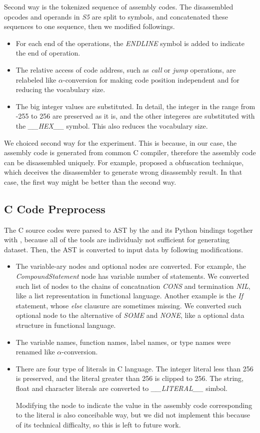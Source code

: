 \documentclass[senior,final,11pt]{iscs-thesis}
\begin{document}
Second way is the tokenized sequence of assembly codes. 
The disassembled opcodes and operands in {\sl S5} are split to symbols, and concatenated these sequences to one sequence, then we modified followings.
\begin{itemize}
\item For each end of the operations, the {\sl ENDLINE} symbol is added to indicate the end of operation.
\item 
The relative access of code address, such as {\sl call} or {\sl jump} operations, 
are relabeled like $\alpha$-conversion for making code position independent and for reducing the vocabulary size.
\item The big integer values are substituted. 
In detail, the integer in the range from -255 to 256 are preserved as it is, and the other integeres are substituted with the {\sl \_\_HEX\_\_} symbol.
This also reduces the vocabulary size.
\end{itemize}

We choiced second way for the experiment.
This is because, in our case, the assembly code is generated from common C compiler, therefore the assembly code can be disassembled uniquely.
For example, \cite{disasm_obfuscate} proposed a obfuscation technique, which deceives the disassembler to generate wrong disassembly result.
In that case, the first way might be better than the second way.

\subsection{C Code Preprocess}
The C source codes were parsed to AST by the \cite{clang} and its Python bindings together with \cite{pycparser}, 
because all of the tools are individualy not sufficient for generating dataset.
Then, the AST is converted to input data by following modifications.

\begin{itemize}
\item The variable-ary nodes and optional nodes are converted. 
For example, the {\sl CompoundStatement} node has variable number of statements. 
We converted such list of nodes to the chains of concatnation {\sl CONS} and termination {\sl NIL}, like a list representation in functional language.
Another example is the  {\sl If} statement, whose {\sl else} clausure are sometimes missing. 
We converted such optional node to the alternative of {\sl SOME} and {\sl NONE}, like a optional data structure in functional language.
\item The variable names, function names, label names, or type names were renamed like $\alpha$-conversion.
\item There are four type of literals in C language. 
The integer literal less than 256 is preserved, and the literal greater than 256 is clipped to 256.
The string, float and character literals are converted to {\sl \_\_LITERAL\_\_} simbol.

Modifying the node to indicate the value in the assembly code corresponding to the literal is also conceibable way,
but we did not implement this because of its technical difficalty, so this is left to future work.
\end{itemize}
\end{document}
